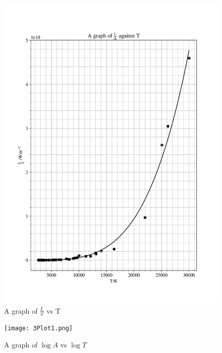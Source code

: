 \documentclass[12pt, a4paper]{article}
\begin{document}
\begin{figure}[H]
    \centering
    \includegraphics[width = \textwidth]{2Plot5.png}
    \caption{A graph of \(\frac{L}{a}\) vs T}
\end{figure}

\begin{figure}[H]
    \centering
    \texttt{[image: 3Plot1.png]}
    \caption{A graph of \(\log{A}\) vs \(\log{T}\)}
\end{figure}
\end{document}
